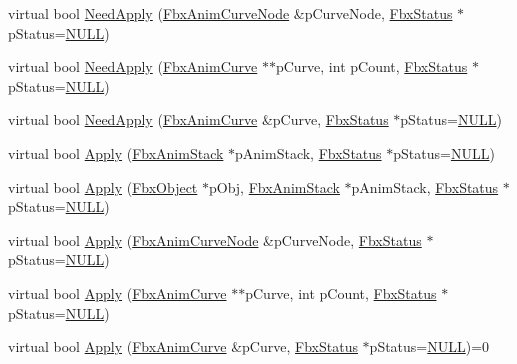 \begin{DoxyCompactItemize}
\item 
virtual bool \hyperlink{class_fbx_anim_curve_filter_a2a88d855d34bb1f2f22ca8386020b33a}{Need\+Apply} (\hyperlink{class_fbx_anim_curve_node}{Fbx\+Anim\+Curve\+Node} \&p\+Curve\+Node, \hyperlink{class_fbx_status}{Fbx\+Status} $\ast$p\+Status=\hyperlink{fbxarch_8h_a070d2ce7b6bb7e5c05602aa8c308d0c4}{N\+U\+LL})
\item 
virtual bool \hyperlink{class_fbx_anim_curve_filter_a6b210eca45b745cf070c46bfaaf3e5b2}{Need\+Apply} (\hyperlink{class_fbx_anim_curve}{Fbx\+Anim\+Curve} $\ast$$\ast$p\+Curve, int p\+Count, \hyperlink{class_fbx_status}{Fbx\+Status} $\ast$p\+Status=\hyperlink{fbxarch_8h_a070d2ce7b6bb7e5c05602aa8c308d0c4}{N\+U\+LL})
\item 
virtual bool \hyperlink{class_fbx_anim_curve_filter_af768a9c47e4f5a5fff47a8ec781e6b4c}{Need\+Apply} (\hyperlink{class_fbx_anim_curve}{Fbx\+Anim\+Curve} \&p\+Curve, \hyperlink{class_fbx_status}{Fbx\+Status} $\ast$p\+Status=\hyperlink{fbxarch_8h_a070d2ce7b6bb7e5c05602aa8c308d0c4}{N\+U\+LL})
\item 
virtual bool \hyperlink{class_fbx_anim_curve_filter_aef3900e6180e05661c27ee484ae939c3}{Apply} (\hyperlink{class_fbx_anim_stack}{Fbx\+Anim\+Stack} $\ast$p\+Anim\+Stack, \hyperlink{class_fbx_status}{Fbx\+Status} $\ast$p\+Status=\hyperlink{fbxarch_8h_a070d2ce7b6bb7e5c05602aa8c308d0c4}{N\+U\+LL})
\item 
virtual bool \hyperlink{class_fbx_anim_curve_filter_a009498a65af4995bf5e5908f17837531}{Apply} (\hyperlink{class_fbx_object}{Fbx\+Object} $\ast$p\+Obj, \hyperlink{class_fbx_anim_stack}{Fbx\+Anim\+Stack} $\ast$p\+Anim\+Stack, \hyperlink{class_fbx_status}{Fbx\+Status} $\ast$p\+Status=\hyperlink{fbxarch_8h_a070d2ce7b6bb7e5c05602aa8c308d0c4}{N\+U\+LL})
\item 
virtual bool \hyperlink{class_fbx_anim_curve_filter_ad042b45c0675278fa49e61739b0825c2}{Apply} (\hyperlink{class_fbx_anim_curve_node}{Fbx\+Anim\+Curve\+Node} \&p\+Curve\+Node, \hyperlink{class_fbx_status}{Fbx\+Status} $\ast$p\+Status=\hyperlink{fbxarch_8h_a070d2ce7b6bb7e5c05602aa8c308d0c4}{N\+U\+LL})
\item 
virtual bool \hyperlink{class_fbx_anim_curve_filter_aca6a41fbc4d9019b20df7adccfa6ed3c}{Apply} (\hyperlink{class_fbx_anim_curve}{Fbx\+Anim\+Curve} $\ast$$\ast$p\+Curve, int p\+Count, \hyperlink{class_fbx_status}{Fbx\+Status} $\ast$p\+Status=\hyperlink{fbxarch_8h_a070d2ce7b6bb7e5c05602aa8c308d0c4}{N\+U\+LL})
\item 
virtual bool \hyperlink{class_fbx_anim_curve_filter_a6a69996c47c0e6f63a0f8b0d5fa806a0}{Apply} (\hyperlink{class_fbx_anim_curve}{Fbx\+Anim\+Curve} \&p\+Curve, \hyperlink{class_fbx_status}{Fbx\+Status} $\ast$p\+Status=\hyperlink{fbxarch_8h_a070d2ce7b6bb7e5c05602aa8c308d0c4}{N\+U\+LL})=0

\end{DoxyCompactItemize}
